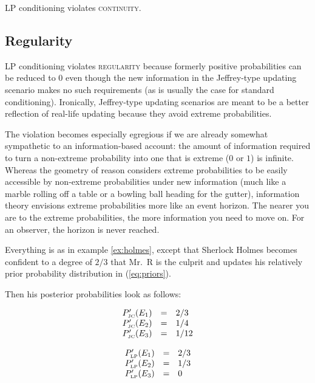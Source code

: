 \documentclass[11pt]{article}
\begin{document}
LP conditioning violates \textsc{continuity}.

\subsection{Regularity}
\label{Regularity}

LP conditioning violates \textsc{regularity} because formerly positive
probabilities can be reduced to $0$ even though the new information in
the Jeffrey-type updating scenario makes no such requirements (as is
usually the case for standard conditioning). Ironically, Jeffrey-type
updating scenarios are meant to be a better reflection of real-life
updating because they avoid extreme probabilities. 

The violation becomes especially egregious if we are already somewhat
sympathetic to an information-based account: the amount of information
required to turn a non-extreme probability into one that is extreme
($0$ or $1$) is infinite. Whereas the geometry of reason considers
extreme probabilities to be easily accessible by non-extreme
probabilities under new information (much like a marble rolling off a
table or a bowling ball heading for the gutter), information theory
envisions extreme probabilities more like an event horizon. The nearer
you are to the extreme probabilities, the more information you need to
move on. For an observer, the horizon is never reached.

\begin{quotex}
  \label{ex:regularity} Everything is as
  in example \ref{ex:holmes}, except that Sherlock Holmes becomes
  confident to a degree of $2/3$ that Mr.\ R is the culprit and
  updates his relatively prior probability distribution in
  (\ref{eq:priors}).
\end{quotex}

Then his posterior probabilities look as follows:

\begin{equation}
  \label{eq:sherlockposteriorjcreg}
  \begin{array}{rcl}
  P'_{\mbox{\tiny JC}}(E_{1})&=&2/3\\
  P'_{\mbox{\tiny JC}}(E_{2})&=&1/4\\
  P'_{\mbox{\tiny JC}}(E_{3})&=&1/12
\end{array}
\end{equation}

\begin{equation}
  \label{eq:sherlockposteriorlpreg}
  \begin{array}{rcl}
  P'_{\mbox{\tiny LP}}(E_{1})&=&2/3\\
  P'_{\mbox{\tiny LP}}(E_{2})&=&1/3\\
  P'_{\mbox{\tiny LP}}(E_{3})&=&0
\end{array}
\end{equation}
\end{document}
